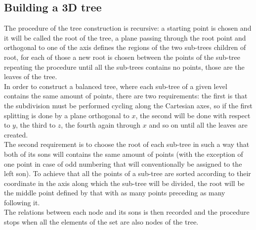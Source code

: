 \subsection{Building a 3D tree}
The procedure of the tree construction is recursive: a starting point is chosen and it will be called the root of the tree, a plane passing through the root point and orthogonal to one of the axis defines the regions of the two sub-trees children of root, for each of those a new root is chosen between the points of the sub-tree repeating the procedure until all the sub-trees contains no points, those are the leaves of the tree.\\
In order to construct a balanced tree, where each sub-tree of a given level contains the same amount of points, there are two requirements: the first is that the subdivision must be performed cycling along the Cartesian axes, so if the first splitting is done by a plane orthogonal to $x$, the second will be done with respect to $y$, the third to $z$, the fourth again through $x$ and so on until all the leaves are created.\\
The second requirement is to choose the root of each sub-tree in such a way that both of its sons will contains the same amount of points (with the exception of one point in case of odd numbering that will conventionally be assigned to the left son). To achieve that all the points of a sub-tree are sorted according to their coordinate in the axis along which the sub-tree will be divided, the root will be the middle point defined by that with as many points preceding as many following it.\\
The relations between each node and its sons is then recorded and the procedure stops when all the elements of the set are also nodes of the tree.

